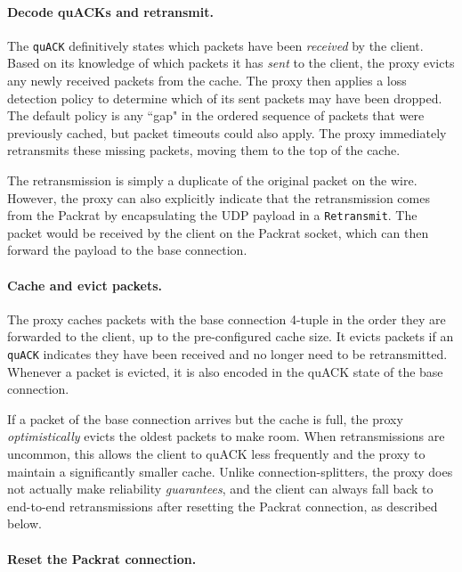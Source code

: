 \paragraph{Decode quACKs and retransmit.}

The \texttt{quACK} definitively states which packets have been \textit{received}
by the client. Based on its knowledge of which packets it has \textit{sent} to
the client, the proxy evicts any newly received packets from the cache. The
proxy then applies a loss detection policy to determine which of its sent
packets may have been dropped. The default
policy is any ``gap" in the ordered sequence of packets that were previously
cached, but packet timeouts could also apply. The proxy immediately retransmits
these missing packets, moving them to the top of the cache.

The retransmission is simply a duplicate of the original packet on the wire.
However, the proxy can also explicitly indicate that the retransmission comes
from the Packrat by encapsulating the UDP payload in a \texttt{Retransmit}. The
packet would be received by the client on the Packrat socket, which can then forward
the payload to the base connection.

\paragraph{Cache and evict packets.}

The proxy caches packets with the base connection 4-tuple in the order they are
forwarded to the client, up to the pre-configured cache size. It evicts packets
if an \texttt{quACK} indicates they have been received and no longer need to be
retransmitted. Whenever a packet is evicted, it is also encoded in the quACK
state of the base connection.

If a packet of the base connection arrives but the cache is full, the
proxy \textit{optimistically} evicts the oldest packets to make room. When
retransmissions are uncommon, this allows the client to quACK less frequently
and the proxy to maintain a significantly smaller cache. Unlike
connection-splitters, the proxy does not actually make reliability \textit
{guarantees}, and the client can always fall back to end-to-end retransmissions
after resetting the Packrat connection, as described below.

\paragraph{Reset the Packrat connection.}

